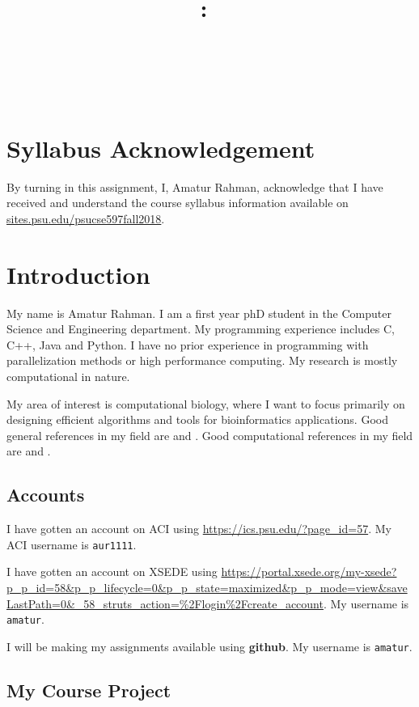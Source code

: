\documentclass{article}
\title{\vspace{2in}\textmd{\textbf{\hmwkClass:\ \hmwkTitle}}\\\normalsize\vspace{0.1in}\small{\hmwkDueDate}\\\vspace{0.1in}\large{\textit{\hmwkClassInstructor\ \hmwkClassTime}}\vspace{3in}}
\date{}
\author{\textbf{\hmwkAuthorNameb} } %
\begin{document}
\begin{spacing}{1.1}
\maketitle

\newpage
\section{Syllabus Acknowledgement}

By turning in this assignment, I, Amatur Rahman, acknowledge that I have received and understand the course syllabus information available on \url{sites.psu.edu/psucse597fall2018}. 


\section{Introduction}

My name is Amatur Rahman.  I am a first year phD student in the Computer Science and Engineering department. My programming experience includes C, C++, Java and Python. I have no prior experience in programming with parallelization methods or high performance computing. My research is mostly computational in nature. 

My area of interest is computational biology, where I want to focus primarily on designing efficient algorithms and tools for bioinformatics applications. Good general references in my field are \cite{gusfield1997algorithms} and \cite{gentleman2006bioinformatics}.  Good computational references in my field are \cite{trelles2001parallelisation} and \cite{he2011mathematics}. 


\subsection{Accounts}

I have gotten an account on ACI using \url{https://ics.psu.edu/?page_id=57}.  My ACI username is \texttt{aur1111}.

I have gotten an account on XSEDE using \url{https://portal.xsede.org/my-xsede?p_p_id=58&p_p_lifecycle=0&p_p_state=maximized&p_p_mode=view&saveLastPath=0&_58_struts_action=%2Flogin%2Fcreate_account}.  My username is \texttt{amatur}.

I will be making my assignments available using \textbf{github}. My username is \texttt{amatur}. 

\subsection{My Course Project}


\end{spacing}
\end{document}
